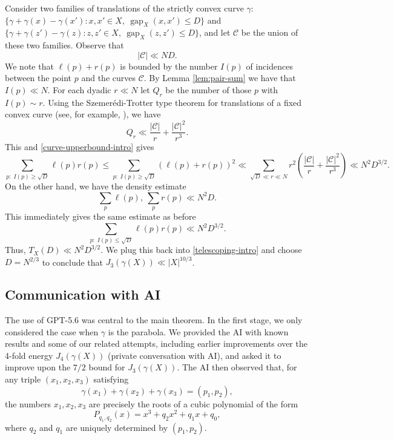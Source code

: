 \documentclass{amsart}
\numberwithin{equation}{section}
\newcommand{\cC}{{\mathcal C}}
\begin{document}
Consider two families of translations of the strictly convex curve $\gamma$: $\{\gamma+\gamma(x)-\gamma(x'): x, x'\in X, \ \operatorname{gap}_X(x,x') \leq D\}$ and $\{\gamma+\gamma(z')-\gamma(z): z, z'\in X, \ \operatorname{gap}_X(z,z') \leq D\}$, and let $\cC$ be the union of these two families.
Observe that 
\begin{equation}
\label{curve-upperbound-intro}
    |\cC|\ll ND.
\end{equation}
We note that $\ell(p)+r(p)$ is bounded by the number $I(p)$ of incidences between the point $p$ and the curves $\cC$. 
By Lemma \ref{lem:pair-sum} we have that $I(p)\ll N$. 
For each dyadic $r\ll N$ let $Q_r$ be the number of those $p$ with $I(p)\sim r$.
Using the  Szemer\'edi-Trotter type theorem for translations of a fixed convex curve (see, for example, \cite[Theorem 6]{Szekely}), we have
\[
Q_r\ll \frac{|\cC|}{r}+\frac{|\cC|^2}{r^3}.
\]
This and \eqref{curve-upperbound-intro} gives
\begin{equation}
    \nonumber
    \sum_{p:\;I(p)\ge \sqrt{D}}\ell(p)r(p)\le \sum_{p:\;I(p)\ge \sqrt{D}}(\ell(p)+r(p))^2\ll \sum_{ \sqrt{D}\ll r\ll N}r^2(\frac{|\cC|}{r}+\frac{|\cC|^2}{r^3})\ll N^2D^{3/2}.
\end{equation}
On the other hand, we have the density estimate
\begin{equation}
    \nonumber
    \sum_{p}\ell(p), \ \sum_{p}r(p)\ll N^2D.
\end{equation}
This immediately gives the same estimate as before 
\[
\sum_{p:\;I(p)\le \sqrt{D}}\ell(p)r(p)\ll N^2D^{3/2}.
\]
Thus, $T_X(D)\ll N^2D^{3/2}$.
We plug this back into \eqref{telescoping-intro} and choose $D=N^{2/3}$ to conclude that $J_3(\gamma(X))\ll |X|^{10/3}$.


\bigskip

\subsection{Communication with AI}
The use of GPT-5.6 was central to the main theorem.
In the first stage, we only considered the case when $\gamma$ is the parabola.
We provided the AI with known results and some of our related attempts, including earlier improvements over the 4-fold energy $J_4(\gamma(X))$ (private conversation with AI), and asked it to improve upon the $7/2$ bound for $J_3(\gamma(X))$.
The AI then observed that, for any triple $(x_1, x_2, x_3)$ satisfying
\begin{equation}
    \label{set-of-pts}
    \gamma(x_1)+\gamma(x_2)+\gamma(x_3)=(p_1,p_2),
\end{equation}
the numbers $x_1, x_2, x_3$ are precisely the roots of a cubic polynomial of the form
\[
    P_{q_1,q_2}(x)=x^3+q_2x^2+q_1x+q_0,
\]
where $q_2$ and $q_1$ are uniquely determined by $(p_1,p_2)$.
\end{document}
